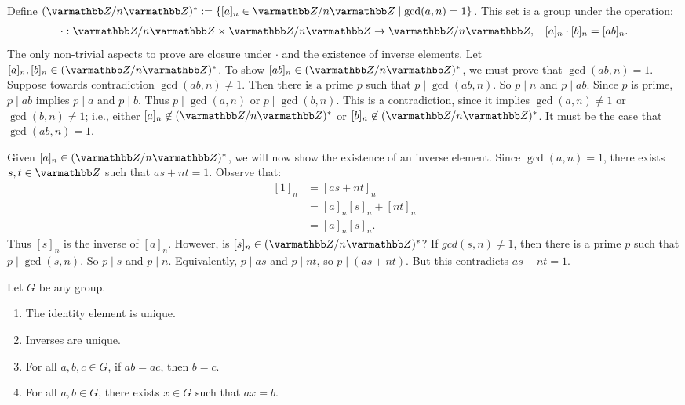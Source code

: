     \begin{example}
        Define $(\bfZ/n\bfZ)^\ast := \{[a]_n \in \bfZ/n\bfZ \mid \gcd(a,n)=1\}$. This set is a group under the operation:
            \begin{equation*}
            \begin{split}
                \cdot:\bfZ/n\bfZ \times \bfZ/n\bfZ \rightarrow \bfZ/n\bfZ, \h9 [a]_n\cdot[b]_n = [ab]_n.
            \end{split}
            \end{equation*}
        The only non-trivial aspects to prove are closure under $\cdot$ and the existence of inverse elements. Let $[a]_n,[b]_n \in (\bfZ/n\bfZ)^\ast$. To show $[ab]_n \in (\bfZ/n\bfZ)^\ast$, we must prove that $\gcd(ab,n) = 1$. Suppose towards contradiction $\gcd(ab,n) \neq 1$. Then there is a prime $p$ such that $p \mid \gcd(ab,n)$. So $p \mid n$ and $p \mid ab$. Since $p$ is prime, $p \mid ab$ implies $p \mid a$ and $p \mid b$. Thus $p \mid \gcd(a,n)$ or $p \mid \gcd(b,n)$. This is a contradiction, since it implies $\gcd(a,n) \neq 1$ or $\gcd(b,n) \neq 1$; i.e., either $[a]_n \not\in (\bfZ/n\bfZ)^\ast$ or $[b]_n \not\in (\bfZ/n\bfZ)^\ast$. It must be the case that $\gcd(ab,n) = 1$.

        Given $[a]_n \in (\bfZ/n\bfZ)^\ast$, we will now show the existence of an inverse element. Since $\gcd(a,n) = 1$, there exists $s,t \in \bfZ$ such that $as + nt = 1$. Observe that:
            \begin{equation*}
            \begin{split}
                [1]_n 
                & = [as + nt]_n \\
                & = [a]_n[s]_n + [nt]_n \\
                & = [a]_n [s]_n.
            \end{split}
            \end{equation*}
        Thus $[s]_n$ is the inverse of $[a]_n$. However, is $[s]_n \in (\bfZ/n\bfZ)^\ast$? If $gcd(s,n) \neq 1$, then there is a prime $p$ such that $p \mid \gcd(s,n)$. So $p \mid s$ and $p \mid n$. Equivalently, $p \mid as$ and $p \mid nt$, so $p \mid (as + nt)$. But this contradicts $as + nt = 1$.
    \end{example}

    \begin{theorem}
        Let $G$ be any group.
        \begin{enumerate}[label = (\arabic*),itemsep=1pt,topsep=3pt]
            \item The identity element is unique.
            \item Inverses are unique.
            \item For all $a,b,c \in G$, if $ab = ac$, then $b=c$.
            \item For all $a,b \in G$, there exists $x \in G$ such that $ax=b$.
        \end{enumerate}
    \end{theorem}


